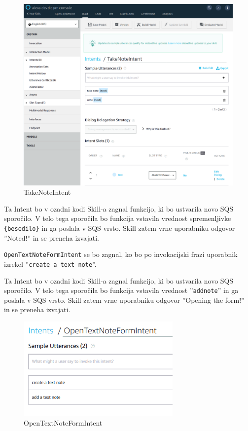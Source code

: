 \documentclass[a4paper, 12pt]{book}
\begin{document}
\begin{figure}[H]
\begin{center}
\includegraphics[width=13cm]{intent_literal}
\end{center}
\caption{TakeNoteIntent}
\label{TakeNoteIntent}
\end{figure}

Ta Intent bo v ozadni kodi Skill-a zagnal funkcijo, ki bo ustvarila novo SQS sporočilo.
V telo tega sporočila bo funkcija vstavila vrednost spremenljivke \texttt{\{besedilo\}} in ga poslala v SQS vrsto.
Skill zatem vrne uporabniku odgovor ''Noted!'' in se preneha izvajati.

\texttt{OpenTextNoteFormIntent} se bo zagnal, ko bo po invokacijski frazi uporabnik izrekel ''\texttt{create a text note}''.

Ta Intent bo v ozadni kodi Skill-a zagnal funkcijo, ki bo ustvarila novo SQS sporočilo.
V telo tega sporočila bo funkcija vstavila vrednost ''\texttt{addnote}'' in ga poslala v SQS vrsto.
Skill zatem vrne uporabniku odgovor ''Opening the form!'' in se preneha izvajati.


\begin{figure}[H]
\begin{center}
\includegraphics[width=8cm]{intent_text}
\end{center}
\caption{OpenTextNoteFormIntent}
\label{OpenTextNoteFormIntent}
\end{figure}
\end{document}
